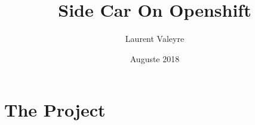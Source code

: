 \documentclass[12pt, letterpaper]{article}
\title{Side Car On Openshift}
\author{Laurent Valeyre}
\date{Auguste 2018}
\begin{document}
\maketitle
\tableofcontents

\section{The Project}


\end{document}
